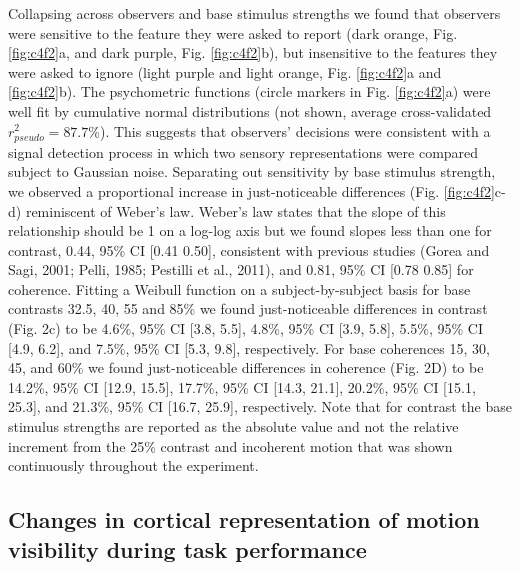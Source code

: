 \documentclass{report}
\begin{document}
Collapsing across observers and base stimulus strengths we found that observers were sensitive to the feature they were asked to report (dark orange, Fig. \ref{fig:c4f2}a, and dark purple, Fig. \ref{fig:c4f2}b), but insensitive to the features they were asked to ignore (light purple and light orange, Fig. \ref{fig:c4f2}a and \ref{fig:c4f2}b). The psychometric functions (circle markers in Fig. \ref{fig:c4f2}a) were well fit by cumulative normal distributions (not shown, average cross-validated $r_{pseudo}^2=87.7$\%). This suggests that observers’ decisions were consistent with a signal detection process in which two sensory representations were compared subject to Gaussian noise. Separating out sensitivity by base stimulus strength, we observed a proportional increase in just-noticeable differences (Fig. \ref{fig:c4f2}c-d) reminiscent of Weber's law. Weber’s law states that the slope of this relationship should be 1 on a log-log axis but we found slopes less than one for contrast, 0.44, 95\% CI [0.41 0.50], consistent with previous studies (Gorea and Sagi, 2001; Pelli, 1985; Pestilli et al., 2011), and 0.81, 95\% CI [0.78 0.85] for coherence. Fitting a Weibull function on a subject-by-subject basis for base contrasts 32.5, 40, 55 and 85\% we found just-noticeable differences in contrast (Fig. 2c) to be 4.6\%, 95\% CI [3.8, 5.5], 4.8\%, 95\% CI [3.9, 5.8], 5.5\%, 95\% CI [4.9, 6.2], and 7.5\%, 95\% CI [5.3, 9.8], respectively. For base coherences 15, 30, 45, and 60\% we found just-noticeable differences in coherence (Fig. 2D) to be 14.2\%, 95\% CI [12.9, 15.5], 17.7\%, 95\% CI [14.3, 21.1], 20.2\%, 95\% CI [15.1, 25.3], and 21.3\%, 95\% CI [16.7, 25.9], respectively. Note that for contrast the base stimulus strengths are reported as the absolute value and not the relative increment from the 25\% contrast and incoherent motion that was shown continuously throughout the experiment.

\subsection{Changes in cortical representation of motion visibility during task performance}
\end{document}
